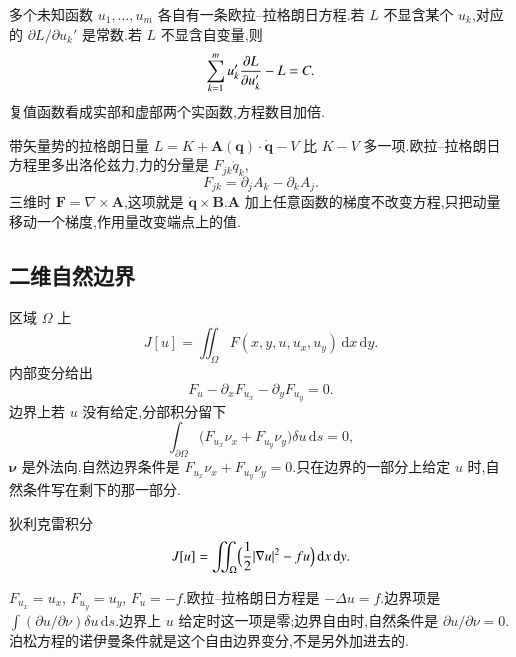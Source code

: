 多个未知函数 $u_1,\ldots,u_m$ 各自有一条欧拉--拉格朗日方程.若 $L$ 不显含某个 $u_k$,对应的 $\partial L/\partial u_k'$ 是常数.若 $L$ 不显含自变量,则
\begin{equation}
  \sum_{k=1}^{m}u_k'\frac{\partial{L}}{\partial{u_k'}}-L=C.
\end{equation}
复值函数看成实部和虚部两个实函数,方程数目加倍.

带矢量势的拉格朗日量 $L=K+\mathbf{A}(\mathbf{q})\cdot\dot{\mathbf{q}}-V$ 比 $K-V$ 多一项.欧拉--拉格朗日方程里多出洛伦兹力,力的分量是 $F_{jk}\dot q_k$,
\begin{equation}
  F_{jk}=\partial_j A_k-\partial_k A_j.
\end{equation}
三维时 $\mathbf{F}=\nabla\times\mathbf{A}$,这项就是 $\dot{\mathbf{q}}\times\mathbf{B}$.$\mathbf{A}$ 加上任意函数的梯度不改变方程,只把动量移动一个梯度,作用量改变端点上的值.

\subsection{二维自然边界}
区域 $\Omega$ 上
\begin{equation}
  J[u]=\iint_{\Omega}F(x,y,u,u_x,u_y)\,\mathrm{d}x\,\mathrm{d}y.
\end{equation}
内部变分给出
\begin{equation}
  F_u-\partial_x F_{u_x}-\partial_y F_{u_y}=0.
\end{equation}
边界上若 $u$ 没有给定,分部积分留下
\begin{equation}
  \int_{\partial\Omega}\bigl(F_{u_x}\nu_x+F_{u_y}\nu_y\bigr)\delta u\,\mathrm{d}s=0,
\end{equation}
$\boldsymbol{\nu}$ 是外法向.自然边界条件是 $F_{u_x}\nu_x+F_{u_y}\nu_y=0$.只在边界的一部分上给定 $u$ 时,自然条件写在剩下的那一部分.

\begin{example}
狄利克雷积分
\begin{equation}
  J[u]=\iint_{\Omega}\Bigl({\frac{1}{2}}|\nabla u|^2-fu\Bigr)\,\mathrm{d}x\,\mathrm{d}y.
\end{equation}
\end{example}
\begin{solution}
$F_{u_x}=u_x$, $F_{u_y}=u_y$, $F_u=-f$.欧拉--拉格朗日方程是 $-\Delta u=f$.边界项是 $\int(\partial u/\partial\nu)\delta u\,\mathrm{d}s$.边界上 $u$ 给定时这一项是零;边界自由时,自然条件是 $\partial u/\partial\nu=0$.泊松方程的诺伊曼条件就是这个自由边界变分,不是另外加进去的.
\end{solution}

